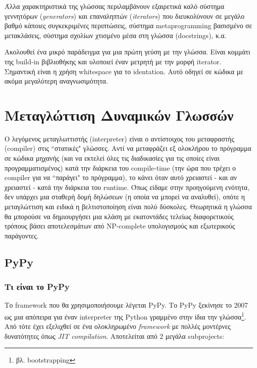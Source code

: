 Άλλα χαρακτηριστικά της γλώσσας περιλαμβάνουν εξαιρετικά καλό σύστημα γεννητόρων
(\textit{generators}) και επαναληπτών (\textit{iterators}) που διευκολύνουν σε
μεγάλο βαθμό κάποιες συγκεκριμένες περιπτώσεις, σύστημα metaprogramming
βασισμένο σε μετακλάσεις, σύστημα σχολίων χτισμένο μέσα στη γλώσσα (docstrings),
κ.α.

Ακολουθεί ένα μικρό παράδειγμα για μια πρώτη γεύση με την γλώσσα. Είναι κομμάτι
της build-in βιβλιοθήκης και υλοποιεί έναν μετρητή με την μορφή iterator.
Σημαντική είναι η χρήση whitespace για το identation. Αυτό οδηγεί σε κώδικα με
ακόμα μεγαλύτερη αναγνωσιμότητα.



\section{Μεταγλώττιση Δυναμικών Γλωσσών}

Ο λεγόμενος μεταγλωττιστής (interpreter) είναι ο αντίστοιχος του μεταφραστής
(compiler) στις ``στατικές" γλώσσες. Αντί να μεταφράζει εξ ολοκλήρου το
πρόγραμμα σε κώδικα μηχανής (και να εκτελεί όλες τις διαδικασίες για τις οποίες
είναι προγραμματισμένος) κατά την διάρκεια του compile-time (την ώρα που τρέχει
ο compiler για να ``παράγει" το πρόγραμμα), το κάνει όταν αυτό χρειαστεί - και
αν χρειαστεί - κατά την διάρκεια του runtime. Όπως είδαμε στην προηγούμενη
ενότητα, δεν υπάρχει μια σταθερή δομή δηλώσεων (η οποία να μπορεί να αναλυθεί),
οπότε η μεταγλώττιση και ειδικά η βελτιστοποίηση είναι πολύ δύσκολες. Θεωρητικά
η γλώσσα θα μπορούσε να δημιουργήσει μια κλάση με εκατοντάδες τελείως
διαφορετικούς τρόπους βάσει αποτελεσμάτων από NP-complete υπολογισμούς και
εξωτερικούς παράγοντες.\cite{rigo2005}

\subsection{PyPy}

\subsubsection{Τι είναι το PyPy}

Το framework που θα χρησιμοποιήσουμε λέγεται PyPy\cite{pypy}. Το PyPy ξεκίνησε
το 2007 ως μια απόπειρα για έναν interpreter της Python γραμμένο στην ίδια την
γλώσσα\footnote{βλ. bootstrapping}. Από τότε έχει εξελιχθεί σε ένα ολοκληρωμένο
\textit{framework} με πολλές μοντέρνες δυνατότητες όπως \textit{JIT
compilation}. Αποτελείται από 2 μεγάλα subprojects:

